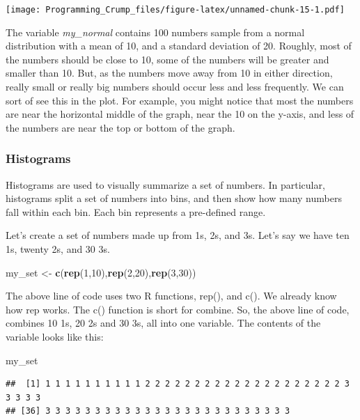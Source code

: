 \documentclass[]{book}
\newenvironment{Shaded}{\begin{snugshade}}{\end{snugshade}}
\newcommand{\KeywordTok}[1]{\textcolor[rgb]{0.13,0.29,0.53}{\textbf{{#1}}}}
\newcommand{\DecValTok}[1]{\textcolor[rgb]{0.00,0.00,0.81}{{#1}}}
\newcommand{\StringTok}[1]{\textcolor[rgb]{0.31,0.60,0.02}{{#1}}}
\newcommand{\NormalTok}[1]{{#1}}
\theoremstyle{definition}
\theoremstyle{definition}
\theoremstyle{definition}
\theoremstyle{remark}
\begin{document}
\texttt{[image: Programming\_Crump\_files/figure-latex/unnamed-chunk-15-1.pdf]}

The variable \emph{my\_normal} contains 100 numbers sample from a normal
distribution with a mean of 10, and a standard deviation of 20. Roughly,
most of the numbers should be close to 10, some of the numbers will be
greater and smaller than 10. But, as the numbers move away from 10 in
either direction, really small or really big numbers should occur less
and less frequently. We can sort of see this in the plot. For example,
you might notice that most the numbers are near the horizontal middle of
the graph, near the 10 on the y-axis, and less of the numbers are near
the top or bottom of the graph.

\subsubsection{Histograms}\label{histograms}

Histograms are used to visually summarize a set of numbers. In
particular, histograms split a set of numbers into bins, and then show
how many numbers fall within each bin. Each bin represents a pre-defined
range.

Let's create a set of numbers made up from 1s, 2s, and 3s. Let's say we
have ten 1s, twenty 2s, and 30 3s.

\begin{Shaded}
\begin{Highlighting}[]
\NormalTok{my_set <-}\StringTok{ }\KeywordTok{c}\NormalTok{(}\KeywordTok{rep}\NormalTok{(}\DecValTok{1}\NormalTok{,}\DecValTok{10}\NormalTok{),}\KeywordTok{rep}\NormalTok{(}\DecValTok{2}\NormalTok{,}\DecValTok{20}\NormalTok{),}\KeywordTok{rep}\NormalTok{(}\DecValTok{3}\NormalTok{,}\DecValTok{30}\NormalTok{))}
\end{Highlighting}
\end{Shaded}

The above line of code uses two R functions, rep(), and c(). We already
know how rep works. The c() function is short for combine. So, the above
line of code, combines 10 1s, 20 2s and 30 3s, all into one variable.
The contents of the variable looks like this:

\begin{Shaded}
\begin{Highlighting}[]
\NormalTok{my_set}
\end{Highlighting}
\end{Shaded}

\begin{verbatim}
##  [1] 1 1 1 1 1 1 1 1 1 1 2 2 2 2 2 2 2 2 2 2 2 2 2 2 2 2 2 2 2 2 3 3 3 3 3
## [36] 3 3 3 3 3 3 3 3 3 3 3 3 3 3 3 3 3 3 3 3 3 3 3 3 3
\end{verbatim}
\end{document}
